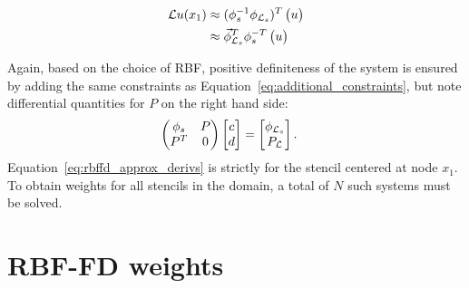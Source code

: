 \documentclass[11pt]{report}
\begin{document}
{%
        \begin{align*} 
        \mathcal{L}u(x_1) &\approx (\phi^{-1}_s \phi_{\mathcal{L}_s})^T \begin{pmatrix} u \end{pmatrix} \\
        &\approx \vec{\phi}_{\mathcal{L}_s}^T \phi^{-T}_s \begin{pmatrix} u \end{pmatrix}
        \end{align*}
        
	
Again, based on the choice of RBF, positive definiteness of the system is ensured by adding the same constraints as Equation~\ref{eq:additional_constraints}, but note differential quantities for $P$ on the right hand side: 
	\begin{align}
		\begin{pmatrix}
		\phi_s & P \\
		P^T & 0
		\end{pmatrix} \begin{bmatrix}
							c \\ 
							d
							\end{bmatrix}
				 &= \begin{bmatrix}
							\phi_{\mathcal{L}_s} \\
							P_{\mathcal{L}}
							 \end{bmatrix}.
	\end{align}
Equation~\ref{eq:rbffd_approx_derivs} is strictly for the stencil centered at node $x_1$. To obtain weights for all stencils in the domain, a total of $N$ such systems must be solved. %




\section{RBF-FD weights}
\label{sec:rbffd}

}
\end{document}
